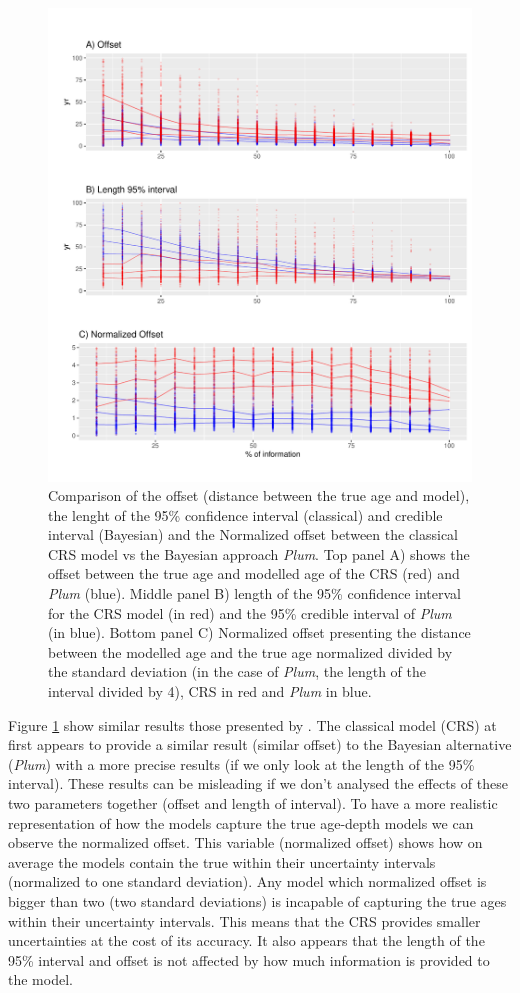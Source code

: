 \documentclass [10pt] {article}
\begin{document}
\begin{figure}[!]
 \centering
  \includegraphics[width=.75\linewidth]{AccPrec.pdf}
	\caption{Comparison of the offset (distance between the true age and model), the lenght of the 95\% confidence interval (classical) and credible interval (Bayesian) and the Normalized offset between the classical CRS model vs the Bayesian approach \textit{Plum}. Top panel A) shows the offset between the true age and modelled age of the CRS (red) and \textit{Plum} (blue). Middle panel B) length of the 95\% confidence interval for the CRS model (in red) and the 95\% credible interval of \textit{Plum} (in blue). Bottom panel C) Normalized offset presenting the distance between the modelled age and the true age normalized divided by the standard deviation (in the case of \textit{Plum}, the length of the interval divided by 4), CRS in red and \textit{Plum} in blue.    }
  \label{fig:accpre}
\end{figure}

Figure \ref{fig:accpre} show similar results those presented by \cite{Blaauw2018}. 
The classical model (CRS) at first appears to provide a similar result (similar offset) to the Bayesian alternative (\textit{Plum}) with a more precise results (if we only look at the length of the 95\% interval). 
These results can be misleading if we don't analysed the effects of these two parameters together (offset and length of interval). 
To have a more realistic representation of how the models capture the true age-depth models we can observe the normalized offset. 
This variable (normalized offset) shows how on average the models contain the true within their uncertainty intervals (normalized to one standard deviation). 
Any model which normalized offset is bigger than two (two standard deviations) is incapable of capturing the true ages within their uncertainty intervals.  
This means that the CRS provides smaller uncertainties at the cost of its accuracy.
It also appears that the length of the 95\% interval and offset is not affected by how much information is provided to the model. 
\end{document}
